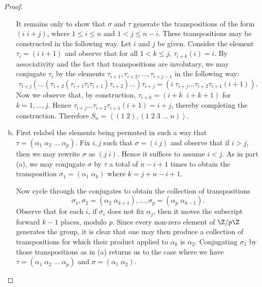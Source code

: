 \documentclass[10pt]{amsart}
\begin{document}
\begin{thm}
\begin{proof}
\begin{enumerate}[(a)]
      It remains only to show that $\sigma$ and $\tau$ generate the transpositions of the form $\left(i\; i + j\right)$, where $1 \leq i \leq n$ and $1 < j \leq n - i$.
      These transpositions may be constructed in the following way.
      Let $i$ and $j$ be given.
      Consider the element $\tau_i = \left(i\; i+1\right)$ and observe that for all $1 < k \leq j$, $\tau_{i+k}(i) = i$.
      By associativity and the fact that transpositions are involutary, we may conjugate $\tau_i$ by the elements $\tau_{i+1}, \tau_{i+2}, \ldots, \tau_{i+j-1}$ in the following way:
      $$\tau_{i+j} \left( \ldots \left( \tau_{i+2} \left(\tau_{i+1} \tau_i\tau_{i+1} \right) \tau_{i+2}\right) \ldots \right) \tau_{i+j} = \left(i\; \tau_{i+j}\ldots\tau_{i+2}\tau_{i+1}\left(i + 1\right) \right).$$
      Now we observe that, by construction, $\tau_{i + k} = \left(i + k \;\; i+k+1\right)$ for $k = 1, \ldots, j$. 
      Hence $\tau_{i+j}\ldots\tau_{i+2}\tau_{i+1}\left(i + 1\right) = i+j$, thereby completing the construction.
      Therefore $S_n = \left<\left(1\; 2\right), \left(1\; 2\; 3\; \ldots\; n\right)\right>$. 
    \item
      First relabel the elements being permuted in such a way that $\tau = (\alpha_1\; \alpha_2\; \ldots\; \alpha_p)$.
      Fix $i,j$ such that $\sigma = (i\; j)$ and observe that if $i > j$, then we may rewrite $\sigma$ as $(j\; i)$.
      Hence it suffices to assume $i < j$.
      As in part (a), we may conjugate $\sigma$ by $\tau$ a total of $n - i + 1$ times to obtain the transposition $\sigma_1 = (\alpha_1\; \alpha_{k})$ where $k = j + n - i + 1$.
      
      Now cycle through the conjugates to obtain the collection of transpositions $$\sigma_1, \sigma_2 = (\alpha_2\; \alpha_{k+1}), \ldots, \sigma_{p} = (\alpha_p\; \alpha_{k-1}).$$
      Observe that for each $i$, if $\sigma_i$ does not fix $\alpha_j$, then it moves the subscript forward $k - 1$ places, modulo $p$.
      Since every non-zero element of $\Z/p\Z$ generates the group, it is clear that one may then produce a collection of transpositions for which their product applied to $\alpha_k$ is $\alpha_2$.
      Conjugating $\sigma_1$ by those transpositions as in (a) returns us to the case where we have $\tau = (\alpha_1\; \alpha_2\; \ldots\; \alpha_p)$ and $\sigma = (\alpha_1\; \alpha_2)$.
    \end{enumerate}
  \end{proof}
\end{thm}
\end{document}
